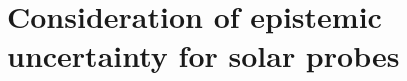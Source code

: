\documentclass[paper,11pt]{AAS}
\begin{document}

\section{Consideration of epistemic uncertainty for solar probes}
\end{document}
